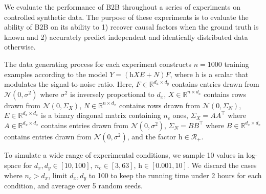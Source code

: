 We evaluate the performance of B2B throughout a series of experiments on
controlled synthetic data.
%
The purpose of these experiments is to evaluate the ability of B2B on its
ability to 1) recover causal factors when the ground truth is known and 2)
accurately predict independent and identically distributed data otherwise.

The data generating process for each experiment constructs $n=1000$ training examples
according to the model $Y = (\text{h} XE + N)F$, where $\text{h}$ is a
scalar that modulates the signal-to-noise ratio.
%
Here,
    $F \in \mathbb{R}^{d_x \times d_y}$ contains entries drawn from
$\mathcal{N}(0, \sigma^2)$ where $\sigma^2$ is inversely proportional to $d_x$,
$X \in \mathbb{R}^{n \times d_x}$ contains rows
drawn from $\mathcal{N}(0, \Sigma_X)$, $N \in \mathbb{R}^{n \times d_x}$
contains rows drawn from $\mathcal{N}(0, \Sigma_N)$, $E \in \mathbb{R}^{d_x
\times d_x}$ is a binary diagonal matrix containing $n_c$ ones, $\Sigma_X =
AA^\top$ where $A \in \mathbb{R}^{d_x \times d_x}$ contains entries drawn from
$\mathcal{N}(0, \sigma^2)$, $\Sigma_N = BB^\top$ where $B \in \mathbb{R}^{d_x
\times d_x}$ contains entries drawn from $\mathcal{N}(0, \sigma^2)$, and the
factor $\text{h} \in \mathcal{R}_+$.

To simulate a wide range of experimental conditions, we sample 10 values in log-space for $d_x, d_y \in \left[ 10, 100 \right]$, $n_c \in \left[ 3, 63 \right]$,
$\text{h} \in \left[ 0.001, 10 \right]$. We discard the cases where $n_c > d_x$, limit $d_x, d_y$ to 100 to keep the running time under 2 hours for each condition, and average over 5 random seeds.
%

